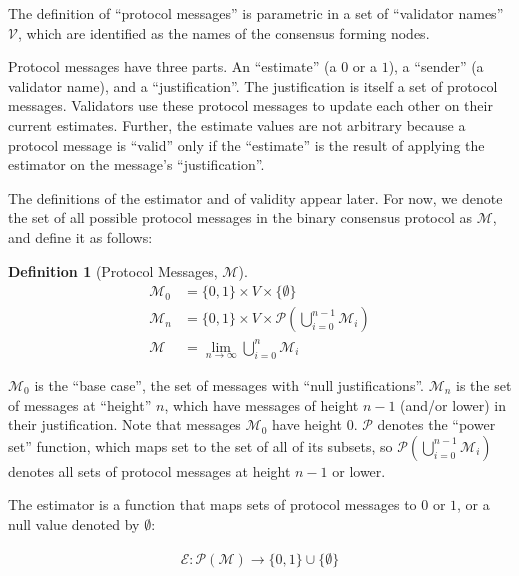 \documentclass{article}
\theoremstyle{definition}
\newtheorem{defn}{Definition}[section]
\begin{document}
The definition of ``protocol messages'' is parametric in a set of ``validator names'' $\mathcal{V}$, which are identified as the names of the consensus forming nodes.

Protocol messages have three parts. An ``estimate'' (a $0$ or a $1$), a ``sender'' (a validator name), and a ``justification''. The justification is itself a set of protocol messages. Validators use these protocol messages to update each other on their current estimates. Further, the estimate values are not arbitrary because a protocol message is ``valid'' only if the ``estimate'' is the result of applying the estimator on the message's ``justification''.

The definitions of the estimator and of validity appear later. For now, we denote the set of all possible protocol messages in the binary consensus protocol as $\mathcal{M}$, and define it as follows:

\begin{defn}[Protocol Messages, $\mathcal{M}$]
\begin{equation*}
\begin{split}
    \mathcal{M}_0 &= \{0, 1\} \times V \times \{\emptyset\}\\
    \mathcal{M}_n &= \{0, 1\} \times V \times \mathcal{P}(\bigcup_{i=0}^{n-1} \mathcal{M}_i)\\
    \mathcal{M} &= \lim_{n \to \infty} \bigcup_{i=0}^{n} \mathcal{M}_i
\end{split}
\end{equation*}
\end{defn}

$\mathcal{M}_0$ is the ``base case'', the set of messages with ``null justifications''. $\mathcal{M}_n$ is the set of messages at ``height'' $n$, which have messages of height $n-1$ (and/or lower) in their justification. Note that messages $\mathcal{M}_0$ have height $0$. $\mathcal{P}$ denotes the ``power set'' function, which maps set to the set of all of its subsets, so $\mathcal{P}(\bigcup_{i=0}^{n-1} \mathcal{M}_i)$ denotes all sets of protocol messages at height $n-1$ or lower.

The estimator is a function that maps sets of protocol messages to $0$ or $1$, or a null value denoted by $\emptyset$:

\begin{equation*}
\begin{split}
    \mathcal{E}:\mathcal{P}(\mathcal{M}) \to \{0, 1\} \cup \{\emptyset\}
\end{split}
\end{equation*}
\end{document}
